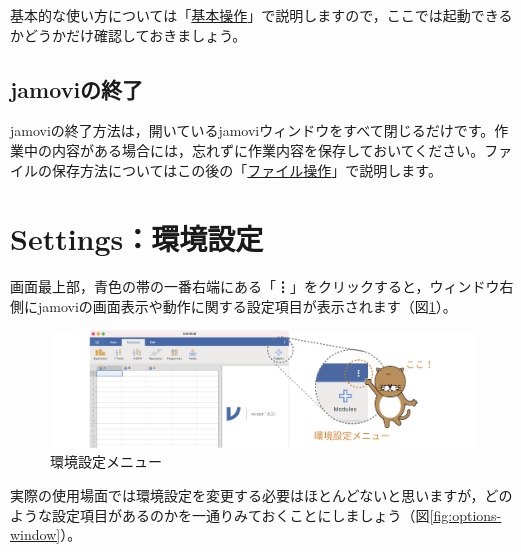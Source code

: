 \documentclass[
  12pt,
  a5jpaper,
  lualatex, ja=standard]{bxjsbook}
\begin{document}
基本的な使い方については「\protect\hyperlink{sec:basics}{基本操作}」で説明しますので，ここでは起動できるかどうかだけ確認しておきましょう。

\hypertarget{sub:intro-quit}{%
\subsection{jamoviの終了}\label{sub:intro-quit}}

jamoviの終了方法は，開いているjamoviウィンドウをすべて閉じるだけです。作業中の内容がある場合には，忘れずに作業内容を保存しておいてください。ファイルの保存方法についてはこの後の「\protect\hyperlink{sec:intro-file}{ファイル操作}」で説明します。

\hypertarget{sec:intro-option}{%
\section{Settings：環境設定}\label{sec:intro-option}}

画面最上部，青色の帯の一番右端にある「\textbf{⋮}」をクリックすると，ウィンドウ右側にjamoviの画面表示や動作に関する設定項目が表示されます（図\ref{fig:options-menu}）。

\begin{figure}[!ht]

{\centering \includegraphics[width=1\linewidth]{images/intro/options-menu} 

}

\caption{環境設定メニュー}\label{fig:options-menu}
\end{figure}

実際の使用場面では環境設定を変更する必要はほとんどないと思いますが，どのような設定項目があるのかを一通りみておくことにしましょう（図\ref{fig:options-window}）。
\end{document}
